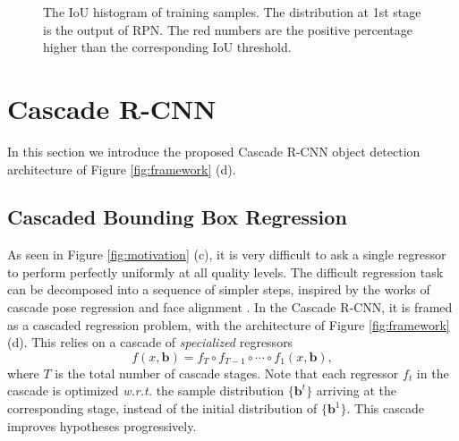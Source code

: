 \documentclass[10pt,twocolumn,letterpaper]{article}
\begin{document}
\begin{figure}[!t]
\begin{minipage}[b]{.3\linewidth}
\centering
\centerline{}
\end{minipage}
\hfill
\begin{minipage}[b]{.3\linewidth}
\centering
\centerline{}
\end{minipage}
\hfill
\begin{minipage}[b]{.3\linewidth}
\centering
\centerline{}
\end{minipage}
\caption{The IoU histogram of training samples. The distribution at 1st stage is the output of RPN. The red numbers are the positive percentage higher than the corresponding IoU threshold.}
\label{fig:hist}
\end{figure}

\section{Cascade R-CNN}

In this section we introduce the proposed Cascade R-CNN object detection architecture of Figure \ref{fig:framework} (d).

\subsection{Cascaded Bounding Box Regression}
\label{subsec:cascade bbox}

As seen in Figure \ref{fig:motivation} (c), it is very difficult to ask
a single regressor to perform perfectly uniformly at all quality levels.
The difficult regression task can be decomposed into a sequence of simpler
steps, inspired by the works of cascade pose
regression \cite{DBLP:conf/cvpr/DollarWP10} and face
alignment \cite{DBLP:conf/cvpr/CaoWWS12,yan2013learn}. In the
Cascade R-CNN, it is framed as a cascaded regression problem, with the
architecture of Figure \ref{fig:framework} (d). This relies on a cascade
of {\it specialized\/} regressors
\begin{equation}
  f(x,\textbf{b})=f_T\circ{f}_{T-1}\circ\cdots\circ{f}_1(x,\textbf{b}),
\end{equation}
where $T$ is the total number of cascade stages. Note that each regressor
$f_t$ in the cascade is optimized \textit{w.r.t.} the sample
distribution $\{\textbf{b}^t\}$ arriving at the corresponding stage,
instead of the initial distribution of $\{\textbf{b}^1\}$. This cascade
improves hypotheses progressively.
\end{document}
